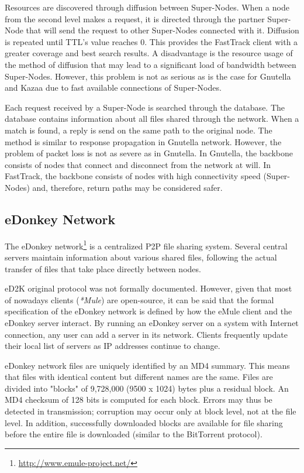 Resources are discovered through diffusion between Super-Nodes. When a node
from the second level makes a request, it is directed through the partner
Super-Node that will send the request to other Super-Nodes connected with it.
Diffusion is repeated until TTL's value reaches 0. This provides the FastTrack
client with a greater coverage and best search results. A disadvantage is the
resource usage of the method of diffusion that may lead to a significant load
of bandwidth between Super-Nodes. However, this problem is not as serious as
is the case for Gnutella and Kazaa due to fast available connections of
Super-Nodes.

Each request received by a Super-Node is searched through the database. The
database contains information about all files shared through the network. When
a match is found, a reply is send on the same path to the original node. The
method is similar to response propagation in Gnutella network. However, the
problem of packet loss is not as severe as in Gnutella. In Gnutella, the
backbone consists of nodes that connect and disconnect from the network at
will. In FastTrack, the backbone consists of nodes with high connectivity
speed (Super-Nodes) and, therefore, return paths may be considered safer.

\subsection{eDonkey Network}

The eDonkey network\footnote{\url{http://www.emule-project.net/}} is a centralized P2P file sharing system. Several central
servers maintain information about various shared files, following the actual
transfer of files that take place directly between nodes.

eD2K original protocol was not formally documented. However, given that most
of nowadays clients (\textit{*Mule}) are open-source, it can be said that the
formal specification of the eDonkey network is defined by how the eMule client and
the eDonkey server interact. By running an eDonkey server on a system with
Internet connection, any user can add a server in its network. Clients
frequently update their local list of servers as IP addresses continue to
change.

eDonkey network files are uniquely identified by an MD4 summary. This means
that files with identical content but different names are the same. Files are
divided into "blocks" of 9,728,000 (9500 x 1024) bytes plus a residual block.
An MD4 checksum of 128 bits is computed for each block. Errors may thus be
detected in transmission; corruption may occur only at block level, not
at the file level. In addition, successfully downloaded blocks are available
for file sharing before the entire file is downloaded (similar to the
BitTorrent protocol).

